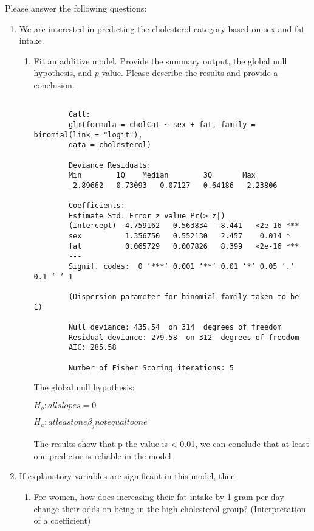 \documentclass[12pt,letterpaper]{article}
\begin{document}
	\newpage
	\noindent Please answer the following questions:
	
	\begin{enumerate}
		\item
		We are interested in predicting the cholesterol category based on sex and fat intake.
		\begin{enumerate}
			\item
			Fit an additive model. Provide the summary output, the global null hypothesis, and $p$-value. Please describe the results and provide a conclusion.
			
		
		
		
			\begin{verbatim}
		
		Call:
		glm(formula = cholCat ~ sex + fat, family = binomial(link = "logit"), 
		data = cholesterol)
		
		Deviance Residuals: 
		Min        1Q    Median        3Q       Max  
		-2.89662  -0.73093   0.07127   0.64186   2.23806  
		
		Coefficients:
		Estimate Std. Error z value Pr(>|z|)    
		(Intercept) -4.759162   0.563834  -8.441   <2e-16 ***
		sex          1.356750   0.552130   2.457    0.014 *  
		fat          0.065729   0.007826   8.399   <2e-16 ***
		---
		Signif. codes:  0 ‘***’ 0.001 ‘**’ 0.01 ‘*’ 0.05 ‘.’ 0.1 ‘ ’ 1
		
		(Dispersion parameter for binomial family taken to be 1)
		
		Null deviance: 435.54  on 314  degrees of freedom
		Residual deviance: 279.58  on 312  degrees of freedom
		AIC: 285.58
		
		Number of Fisher Scoring iterations: 5
		\end{verbatim}
	
	The global null hypothesis:
	
	$H_{o}: all slopes = 0$
	
	$H_{a}: at least one \beta_{j} not equal to one$
	
	
	The results show that p the value is < 0.01, we can conclude that at least one predictor is reliable in the model.
	
	
		\end{enumerate}
		
		\item
		If explanatory variables are significant in this model, then
		\begin{enumerate}
			\item
			For women, how does increasing their fat intake by 1 gram per day change their odds on being in the high cholesterol group? (Interpretation of a coefficient)
		

\end{enumerate}
\end{enumerate}
\end{document}
